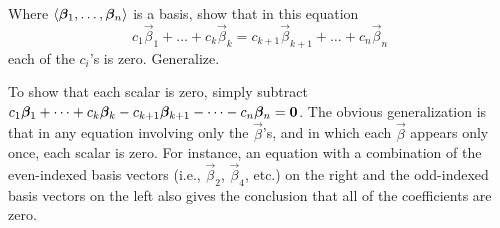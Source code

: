 
\begin{Exercise}[
name={},
title={}, 
difficulty=0,
origin={\cite{JH}}]
    Where
    \( \langle\bm{\beta}_1,\dots,\bm{\beta}_n \rangle \)
    is a basis, show that in this equation
    \begin{equation*}
       c_1\vec{\beta}_1+\dots+c_k\vec{\beta}_k
       =
       c_{k+1}\vec{\beta}_{k+1}+\dots+c_n\vec{\beta}_n
    \end{equation*}
    each of the \( c_i \)'s is zero.
    Generalize.
\end{Exercise}

\begin{Answer}
      To show that each scalar is zero, simply subtract
      \( c_1\bm{\beta}_1+\dots+c_k\bm{\beta}_k
          -c_{k+1}\bm{\beta}_{k+1}-\dots-c_n\bm{\beta}_n=\bm{0} \).
      The obvious generalization is that in any equation involving only the
      \( \vec{\beta} \)'s, and in which each \( \vec{\beta} \) appears only
      once, each scalar is zero.
      For instance, an equation with a combination of 
      the even-indexed basis vectors
      (i.e., $\vec{\beta}_2$, $\vec{\beta}_4$, etc.) on the right and the
      odd-indexed basis vectors on the left also gives the conclusion that
      all of the coefficients are zero. 
\end{Answer}
